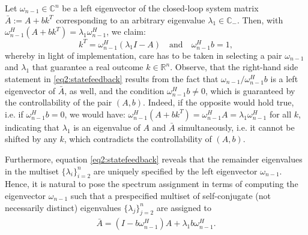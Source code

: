 \documentclass[conference]{IEEEtran}
\newcommand{\acl}{\bar{A}}
\newcommand{\om}{\omega}
\begin{document}
Let ${\om_{n-1}}\in \mathbb{C}^n$ be a left  eigenvector of the closed-loop system matrix $\acl:=A+b k^T$ corresponding to an arbitrary eigenvalue $\lambda_1 \in \mathbb{C}_-$. Then, with $\om_{n-1}^H(A+ bk^{T})=\lambda_{1}\om_{n-1}^H$, we claim:
\begin{equation}
k^T = {\om_{n-1}^H (\lambda_1 I -A)}\quad\text{and}\quad \om_{n-1}^Hb=1,
\label{eq2:statefeedback}
\end{equation}
whereby in light of implementation, care has to be taken in selecting a pair $\om_{n-1}$ and $\lambda_1$ that guarantee a real outcome $k\in\mathbb{R}^n$.
Observe, that  the right-hand side statement in
\eqref{eq2:statefeedback} results from the fact that $\om_{n-1}
/\om^H_{n-1} b$ is a left eigenvector of $\acl$, as well, and the
condition $\om_{n-1}^H b \neq 0$, which is guaranteed by the
controllability of the pair $(A,b)$. Indeed, if the opposite would
hold true, i.e. if $\om_{n-1}^Hb=0$, we would have:
$\om_{n-1}^H(A+bk^T)=\om_{n-1}^H A=\lambda_1 \om_{n-1}^H$ for all
$k$, indicating that $\lambda_1$ is an eigenvalue of $A$ and $\acl$
simultaneously, i.e. it cannot be shifted by any $k$, which
contradicts the controllability of $(A,b)$.


Furthermore, equation \eqref{eq2:statefeedback} reveals that the
remainder eigenvalues in the multiset $\{\lambda_i\}_{i=2}^n$ are
uniquely specified by the left eigenvector $\omega_{n-1}$. Hence, it
is natural to pose the spectrum assignment in terms of computing
the eigenvector $\om_{n-1}$ such that a prespecified multiset of
self-conjugate (not necessarily distinct) eigenvalues
$\{\lambda_j\}_{j=2}^n$ are assigned to
\begin{align}
\label{eq:Acl}
\acl= \left(I-{b \om_{n-1}^H}\right)A+\lambda_{1}{b\om_{n-1}^H}.
\end{align}
\end{document}
